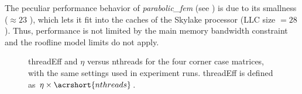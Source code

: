 The peculiar performance behavior of
\emph{parabolic\_fem}
(see ) is due to 
its smallness ($\approx 23$ \MB), which lets it fit into the caches of the
Skylake processor (\acrshort{LLC} size $= 28$ \MB). Thus, performance is not
limited by the main memory bandwidth constraint and the roof{}line model limits do
not apply.
\begin{figure}[t]
	\centering
	\caption{\acrshort{threadEff} and $\eta$ versus \acrshort{nthreads} for
	the four corner case matrices, with the same settings used in experiment
	runs. \acrshort{threadEff} is defined as
	$\eta\times\acrshort{nthreads}$.}
	\label{fig:corner_cases_param}
\end{figure}
